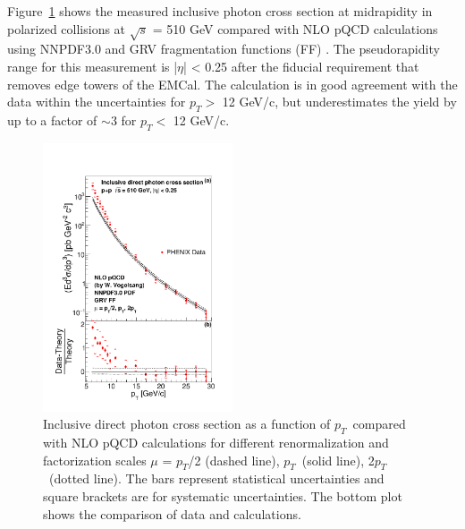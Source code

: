 \documentclass[twocolumn,letterpaper,aps,prl,longbibliography,superscriptaddress,floatfix]{revtex4-2}
\newcommand{\pT}{\ensuremath{p_T}}
\begin{document}
Figure~\ref{fig:inc} shows the measured inclusive photon cross section at midrapidity in polarized collisions at $\sqrt{s}$ = 510 GeV compared with NLO pQCD calculations \cite{PhysRevD.48.3136,PhysRevD.50.1901} using NNPDF3.0 \cite{Ball2015,Bonvini2015} and GRV fragmentation functions (FF) \cite{PhysRevD.45.3986}. The pseudorapidity range for this measurement is |$\eta$| < 0.25 after the fiducial requirement that removes edge towers of the EMCal. The calculation is in good agreement with the data within the uncertainties for $p_T >$ 12 GeV/c, but underestimates the yield by up to a factor of $\sim$3 for $p_T <$ 12 GeV/c.

\begin{figure}
\includegraphics[width=0.5\textwidth]{CrossSection-photon-werner}
\caption{Inclusive direct photon cross section as a function of \pT\ compared with NLO pQCD calculations \cite{PhysRevD.48.3136,PhysRevD.50.1901} for different renormalization and factorization scales $\mu$ = \pT/2 (dashed line), \pT\ (solid line), 2\pT\ (dotted line). The bars represent statistical uncertainties and square brackets are for systematic uncertainties. The bottom plot shows the comparison of data and calculations.}
\label{fig:inc}
\end{figure}
\end{document}
